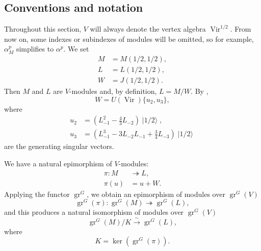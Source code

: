 \documentclass[a4paper, 12pt, reqno]{amsart}
\theoremstyle{remark}
\numberwithin{equation}{subsection}
\DeclareMathOperator{\Vir}{Vir}
\DeclareMathOperator{\gr}{gr}
\DeclareMathOperator{\vachalf}{|1/2\rangle}
\begin{document}
\subsection{Conventions and notation}
\label{sec:conventions-notation}

Throughout this section, $V$ will always denote the vertex algebra $\Vir^{1/2}$.
From now on, some indexes or subindexes of modules will be omitted, so for example, $\alpha^p_M$ simplifies to $\alpha^p$.
We set
\begin{align*}
  M &= M(1/2, 1/2), \\
  L &= L(1/2, 1/2), \\
  W &= J(1/2, 1/2).
\end{align*}
Then $M$ and $L$ are $V$-modules and, by definition, $L = M/W$.
By ,
\begin{equation}
  \label{eq:40}
  W = U(\Vir)\{u_2, u_3\},
\end{equation}
where
\begin{align*}
  u_2 &= (L_{-1}^2 - \tfrac{4}{3}L_{-2})\vachalf, \\
  u_3 &= (L_{-1}^3 - 3L_{-2}L_{-1} + \tfrac{3}{4}L_{-3})\vachalf
\end{align*}
are the generating singular vectors.

We have a natural epimorphism of $V$-modules:
\begin{align*}
  \pi: M &\twoheadrightarrow L, \\
  \pi(u) &= u + W.
\end{align*}
Applying the functor $\gr^G$, we obtain an epimorphism of modules over $\gr^G(V)$
\begin{equation*}
  \gr^G(\pi): \gr^G(M) \twoheadrightarrow \gr^G(L),
\end{equation*}
and this produces a natural isomorphism of modules over $\gr^G(V)$
\begin{equation*}
  \gr^G(M)/K \xrightarrow{\sim} \gr^G(L),
\end{equation*}
where
\begin{equation}
  \label{eq:41}
  K = \ker(\gr^G(\pi)).
\end{equation}
\end{document}
